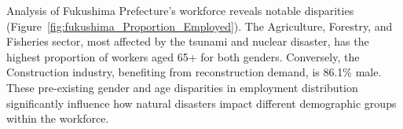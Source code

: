 \documentclass[a4paper,12pt]{article}
\begin{document}


Analysis of Fukushima Prefecture's workforce reveals notable disparities (Figure~\ref{fig:fukushima_Proportion_Employed}). The Agriculture, Forestry, and Fisheries sector, most affected by the tsunami and nuclear disaster, has the highest proportion of workers aged 65+ for both genders. Conversely, the Construction industry, benefiting from reconstruction demand, is 86.1\% male. These pre-existing gender and age disparities in employment distribution significantly influence how natural disasters impact different demographic groups within the workforce.
\end{document}
